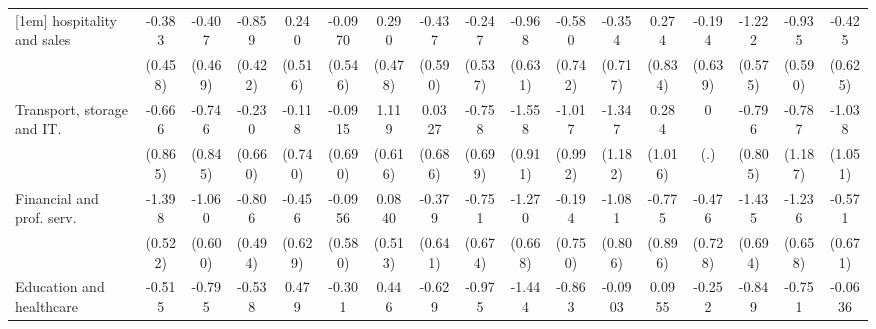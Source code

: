 {\begin{tabular}{l*{16}{c}}
[1em]
hospitality and sales&      -0.383         &      -0.407         &      -0.859\sym{*}  &       0.240         &     -0.0970         &       0.290         &      -0.437         &      -0.247         &      -0.968         &      -0.580         &      -0.354         &       0.274         &      -0.194         &      -1.222\sym{*}  &      -0.935         &      -0.425         \\
                    &     (0.458)         &     (0.469)         &     (0.422)         &     (0.516)         &     (0.546)         &     (0.478)         &     (0.590)         &     (0.537)         &     (0.631)         &     (0.742)         &     (0.717)         &     (0.834)         &     (0.639)         &     (0.575)         &     (0.590)         &     (0.625)         \\
[1em]
Transport, storage and IT.&      -0.666         &      -0.746         &      -0.230         &      -0.118         &     -0.0915         &       1.119         &      0.0327         &      -0.758         &      -1.558         &      -1.017         &      -1.347         &       0.284         &           0         &      -0.796         &      -0.787         &      -1.038         \\
                    &     (0.865)         &     (0.845)         &     (0.660)         &     (0.740)         &     (0.690)         &     (0.616)         &     (0.686)         &     (0.699)         &     (0.911)         &     (0.992)         &     (1.182)         &     (1.016)         &         (.)         &     (0.805)         &     (1.187)         &     (1.051)         \\
[1em]
Financial and prof. serv.&      -1.398\sym{**} &      -1.060         &      -0.806         &      -0.456         &     -0.0956         &      0.0840         &      -0.379         &      -0.751         &      -1.270         &      -0.194         &      -1.081         &      -0.775         &      -0.476         &      -1.435\sym{*}  &      -1.236         &      -0.571         \\
                    &     (0.522)         &     (0.600)         &     (0.494)         &     (0.629)         &     (0.580)         &     (0.513)         &     (0.641)         &     (0.674)         &     (0.668)         &     (0.750)         &     (0.806)         &     (0.896)         &     (0.728)         &     (0.694)         &     (0.658)         &     (0.671)         \\
[1em]
Education and healthcare&      -0.515         &      -0.795         &      -0.538         &       0.479         &      -0.301         &       0.446         &      -0.629         &      -0.975         &      -1.444\sym{*}  &      -0.863         &     -0.0903         &      0.0955         &      -0.252         &      -0.849         &      -0.751         &     -0.0636         \\

\end{tabular}}
